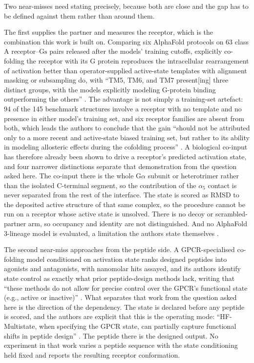 Two near-misses need stating precisely, because both are close and the gap has to be defined
against them rather than around them.

The first supplies the partner and measures the receptor, which is the combination this work is
built on. Comparing six AlphaFold protocols on 63 class A receptor--G$\mathrm{s}$ pairs released after the
models' training cutoffs, explicitly co-folding the receptor with its G protein reproduces the
intracellular rearrangement of activation better than operator-supplied active-state templates
with alignment masking or subsampling do, with ``TM5, TM6, and TM7 present[ing] three distinct
groups, with the models explicitly modeling G-protein binding outperforming the others''
\citep[p.~6302]{chiesa2025templatebias}. The advantage is not simply a training-set artefact: 94 of the
145 benchmark structures involve a receptor with no template and no presence in either model's
training set, and six receptor families are absent from both, which leads the authors to conclude
that the gain ``should not be attributed only to a more recent and active-state biased training
set, but rather to its ability in modeling allosteric effects during the cofolding process''
\citep[p.~6305]{chiesa2025templatebias}. A biological co-input has therefore already been shown to drive a
receptor's predicted activation state, and four narrower distinctions separate that demonstration
from the question asked here. The co-input there is the whole G$\alpha$ subunit or heterotrimer rather
than the isolated C-terminal segment, so the contribution of the $\alpha_5$ contact is never separated
from the rest of the interface. The state is scored as RMSD to the deposited active structure of
that same complex, so the procedure cannot be run on a receptor whose active state is unsolved.
There is no decoy or scrambled-partner arm, so occupancy and identity are not distinguished. And
no AlphaFold 3-lineage model is evaluated, a limitation the authors state themselves
\citep[p.~6299]{chiesa2025templatebias}.

The second near-miss approaches from the peptide side. A GPCR-specialised co-folding model
conditioned on activation state ranks designed peptides into agonists and antagonists, with
nanomolar hits assayed, and its authors identify state control as exactly what prior
peptide-design methods lack, writing that ``these methods do not allow for precise control over the
GPCR's functional state (e.g., active or inactive)'' \citep[p.~11426]{yang2025statespecific}. What separates
that work from the question asked here is the direction of the dependency. The state is declared
before any peptide is scored, and the authors are explicit that this is the operating mode:
``HF-Multistate, when specifying the GPCR state, can partially capture functional shifts in peptide
design'' \citep[p.~11434]{yang2025statespecific}. The peptide there is the designed output. No experiment in
that work varies a peptide sequence with the state conditioning held fixed and reports the
resulting receptor conformation.

